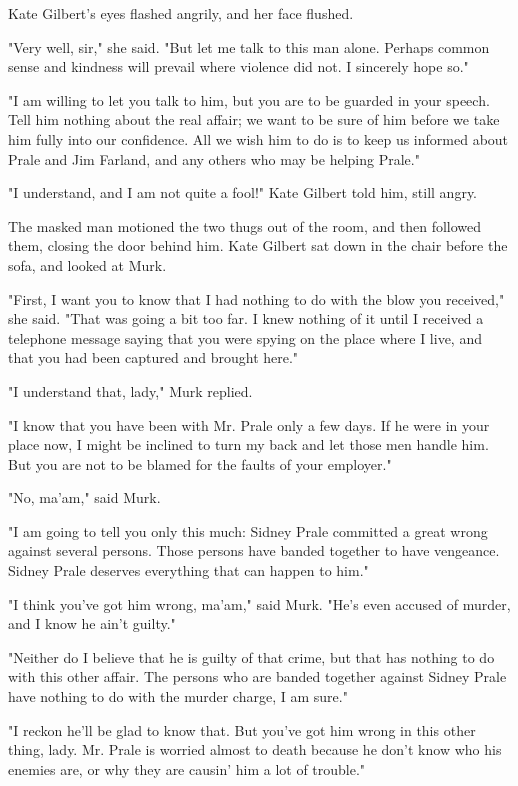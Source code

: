 \documentclass{novel}
\begin{document}
Kate Gilbert's eyes flashed angrily, and her face flushed.

"Very well, sir," she said. "But let me talk to this man alone. Perhaps common sense and kindness will prevail where violence did not. I sincerely hope so."

"I am willing to let you talk to him, but you are to be guarded in your speech. Tell him nothing about the real affair; we want to be sure of him before we take him fully into our confidence. All we wish him to do is to keep us informed about Prale and Jim Farland, and any others who may be helping Prale."

"I understand, and I am not quite a fool!" Kate Gilbert told him, still angry.

The masked man motioned the two thugs out of the room, and then followed them, closing the door behind him. Kate Gilbert sat down in the chair before the sofa, and looked at Murk.

"First, I want you to know that I had nothing to do with the blow you received," she said. "That was going a bit too far. I knew nothing of it until I received a telephone message saying that you were spying on the place where I live, and that you had been captured and brought here."

"I understand that, lady," Murk replied.

"I know that you have been with Mr. Prale only a few days. If he were in your place now, I might be inclined to turn my back and let those men handle him. But you are not to be blamed for the faults of your employer."

"No, ma'am," said Murk.

"I am going to tell you only this much: Sidney Prale committed a great wrong against several persons. Those persons have banded together to have vengeance. Sidney Prale deserves everything that can happen to him."

"I think you've got him wrong, ma'am," said Murk. "He's even accused of murder, and I know he ain't guilty."

"Neither do I believe that he is guilty of that crime, but that has nothing to do with this other affair. The persons who are banded together against Sidney Prale have nothing to do with the murder charge, I am sure."

"I reckon he'll be glad to know that. But you've got him wrong in this other thing, lady. Mr. Prale is worried almost to death because he don't know who his enemies are, or why they are causin' him a lot of trouble."
\end{document}
